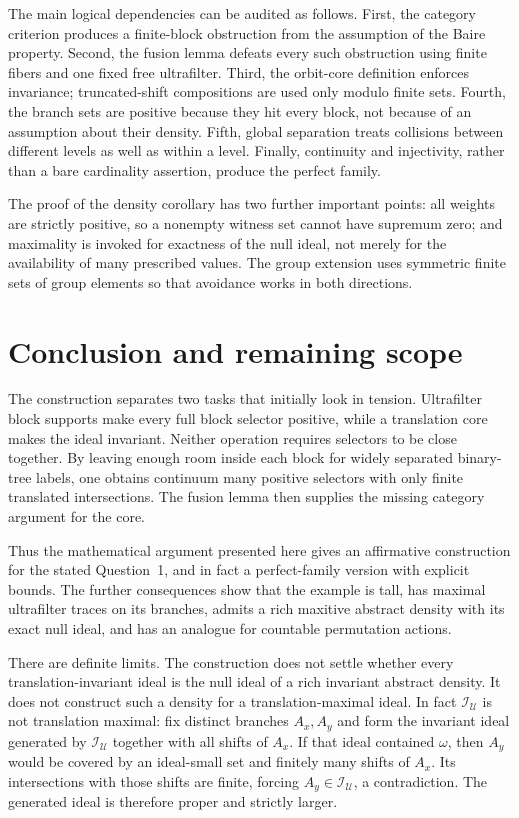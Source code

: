 \documentclass[11pt,a4paper]{article}
\theoremstyle{definition}
\theoremstyle{remark}
\newcommand{\I}{\mathcal I}
\newcommand{\U}{\mathcal U}
\begin{document}
The main logical dependencies can be audited as follows. First, the
category criterion produces a finite-block obstruction from the
assumption of the Baire property. Second, the fusion lemma defeats
every such obstruction using finite fibers and one fixed free
ultrafilter. Third, the orbit-core definition enforces invariance;
truncated-shift compositions are used only modulo finite sets. Fourth,
the branch sets are positive because they hit every block, not because
of an assumption about their density. Fifth, global separation treats
collisions between different levels as well as within a level. Finally,
continuity and injectivity, rather than a bare cardinality assertion,
produce the perfect family.

The proof of the density corollary has two further important points:
all weights are strictly positive, so a nonempty witness set cannot
have supremum zero; and maximality is invoked for exactness of the
null ideal, not merely for the availability of many prescribed values.
The group extension uses symmetric finite sets of group elements so
that avoidance works in both directions.

\section{Conclusion and remaining scope}
\label{sec:conclusion}

The construction separates two tasks that initially look in tension.
Ultrafilter block supports make every full block selector positive,
while a translation core makes the ideal invariant. Neither operation
requires selectors to be close together. By leaving enough room inside
each block for widely separated binary-tree labels, one obtains
continuum many positive selectors with only finite translated
intersections. The fusion lemma then supplies the missing category
argument for the core.

Thus the mathematical argument presented here gives an affirmative
construction for the stated Question~1, and in fact a perfect-family
version with explicit bounds. The further consequences show that the
example is tall, has maximal ultrafilter traces on its branches, admits
a rich maxitive abstract density with its exact null ideal, and has an
analogue for countable permutation actions.

There are definite limits. The construction does not settle whether
every translation-invariant ideal is the null ideal of a rich invariant
abstract density. It does not construct such a density for a
translation-maximal ideal. In fact $\I_\U$ is not translation maximal:
fix distinct branches $A_x,A_y$ and form the invariant ideal generated
by $\I_\U$ together with all shifts of $A_x$. If that ideal contained
$\omega$, then $A_y$ would be covered by an ideal-small set and finitely
many shifts of $A_x$. Its intersections with those shifts are finite,
forcing $A_y\in\I_\U$, a contradiction. The generated ideal is
therefore proper and strictly larger.
\end{document}
